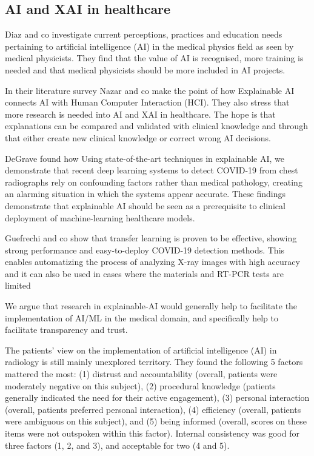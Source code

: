 \documentclass[manuscript,screen,review]{acmart}
\begin{document}
\subsection{AI and XAI in healthcare}\label{subsec:ai-in-healthcare}
Diaz and co investigate current perceptions, practices and education needs pertaining to artificial intelligence (AI) in the medical physics field as seen by medical physicists.
They find that the value of AI is recognised, more training is needed and that medical physicists should be more included in AI projects.\cite{Diaz2021}

In their literature survey Nazar and co make the point of how Explainable AI connects AI with Human Computer Interaction (HCI).
They also stress that more research is needed into AI and XAI in healthcare.
The hope is that explanations can be compared and validated with clinical knowledge and through that either create new
clinical knowledge or correct wrong AI decisions.\cite{Nazar2021}

DeGrave found how Using state-of-the-art techniques in explainable AI, we demonstrate that recent deep learning systems to detect COVID-19 from chest radiographs rely on confounding factors rather than medical pathology, creating an alarming situation in which the systems appear accurate.
These findings demonstrate that explainable AI should be seen as a prerequisite to clinical deployment of machine-learning healthcare models\cite{DeGrave2021}.

Guefrechi and co show that transfer learning is proven to be effective, showing strong performance and easy-to-deploy COVID-19 detection methods.
This enables automatizing the process of analyzing X-ray images with high accuracy and it can also be used in cases where the materials and RT-PCR tests are limited\cite{Guefrechi2021}

We argue that research in explainable-AI would generally help to facilitate the implementation of AI/ML in the medical domain, and specifically help to facilitate transparency and trust.\cite{Holzinger2017}

The patients' view on the implementation of artificial intelligence (AI) in radiology is still mainly unexplored territory.
They found the following 5 factors mattered the most: (1) distrust and accountability (overall, patients were moderately negative on this subject), (2) procedural knowledge (patients generally indicated the need for their active engagement), (3) personal interaction (overall, patients preferred personal interaction), (4) efficiency (overall, patients were ambiguous on this subject), and (5) being informed (overall, scores on these items were not outspoken within this factor).
Internal consistency was good for three factors (1, 2, and 3), and acceptable for two (4 and 5)\cite{Ongena2020}.
\end{document}
